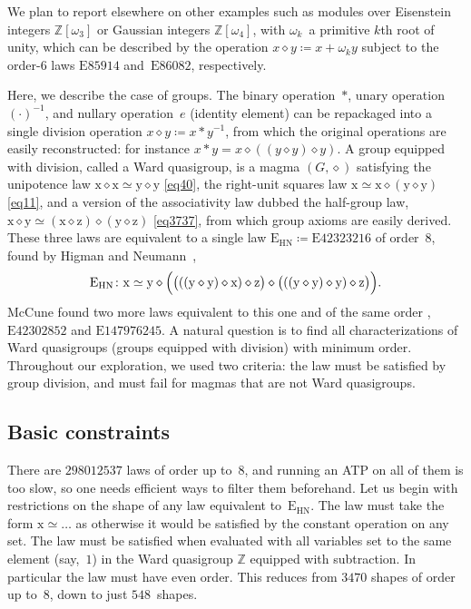 \documentclass[12pt]{amsart}
\theoremstyle{definition}
\newcommand{\x}{\mathrm{x}}
\newcommand{\y}{\mathrm{y}}
\newcommand{\z}{\mathrm{z}}
\newcommand{\op}{\diamond}
\newcommand{\formaleq}{\simeq}
\newcommand{\Eq}[1]{\mathrm{E}#1}
\newcommand{\E}{\mathrm{E}}
\begin{document}
We plan to report elsewhere on other examples such as modules over Eisenstein integers $\mathbb{Z}[\omega_3]$ or Gaussian integers $\mathbb{Z}[\omega_4]$, with $\omega_k$~a primitive $k$th root of unity, which can be described by the operation $x \op y \coloneqq x + \omega_k y$ subject to the order-$6$ laws $\Eq{85914}$ and~$\Eq{86082}$, respectively.

Here, we describe the case of groups.  The binary operation~$*$, unary operation~$(\cdot )^{-1}$, and nullary operation~$e$ (identity element) can be repackaged into a single division operation $x \op y \coloneqq x*y^{-1}$, from which the original operations are easily reconstructed: for instance $x*y=x\op((y\op y)\op y)$.  A group equipped with division, called a Ward quasigroup, is a magma $(G, \op)$ satisfying the unipotence law $\x \op \x \formaleq \y \op \y$ \eqref{eq40}, the right-unit squares law $\x \formaleq \x \op (\y \op \y)$ \eqref{eq11}, and a version of the associativity law dubbed the half-group law, $\x \op \y \formaleq (\x \op \z) \op (\y \op \z)$ \eqref{eq3737}, from which group axioms are easily derived.
These three laws are equivalent to a single law $\E_{\mathrm{HN}}\coloneqq \Eq{42323216}$ of order~$8$, found by Higman and Neumann~\cite{higman-neumann},
\[
\E_{\mathrm{HN}} \colon \x \formaleq \y \op \Bigl(\bigl(((\y \op \y) \op \x) \op \z\bigr) \op \bigl(((\y \op \y) \op \y) \op \z\bigr)\Bigr).
\]
McCune found two more laws equivalent to this one and of the same order \cite{mccune1993single}, $\Eq{42302852}$ and $\Eq{147976245}$.  A natural question is to find all characterizations of Ward quasigroups (groups equipped with division) with minimum order.
Throughout our exploration, we used two criteria: the law must be satisfied by group division, and must fail for magmas that are not Ward quasigroups.

\subsection{Basic constraints}

There are $\num{298012537}$ laws of order up to~$8$, and running an ATP on all of them is too slow, so one needs efficient ways to filter them beforehand.  Let us begin with restrictions on the shape of any law equivalent to~$\E_{\mathrm{HN}}$.
The law must take the form $\x\formaleq\dots$ as otherwise it would be satisfied by the constant operation on any set.
The law must be satisfied when evaluated with all variables set to the same element (say,~$1$) in the Ward quasigroup $\mathbb{Z}$ equipped with subtraction.  In particular the law must have even order.
This reduces from $\num{3470}$ shapes of order up to~$8$, down to just $548$~shapes.
\end{document}
